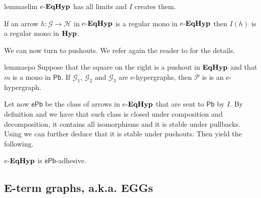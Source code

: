 \documentclass[a4paper,UKenglish,cleveref,pdftex,thm-restate,numberwithinsect]{lipics-v2021}
\newcommand{\pbc}{\mathsf{Pb}}
\newcommand{\pbe}{\mathsf{ePb}}
\newcommand{\catname}[1]{\textbf{\textup{#1}}}
\newcommand{\hyp}{\catname{Hyp}}
\newcommand{\EqHyp}{\catname{EqHyp}} %
\newcommand{\egg}{\mathsf{e}\text{-}\catname{EqHyp}}
\newcommand{\commentato}[1]{ {} }
\begin{document}
\begin{restatable}{lemma}{elim}\label{lem:elim}
	$\egg$ has all limits and $I$ creates them.
\end{restatable}


\begin{corollary}\label{cor:ereg}
	If an arrow $h: \mathcal{G \to H}$ in $\egg$ is a regular mono in $\egg$ then $I(h)$ is a regular mono in $\hyp$. 
\end{corollary}

We can now turn to pushouts. We refer again the reader to  for the details.

\noindent
\parbox{11.5cm}{\begin{restatable}{lemma}{epo}\label{lem:epo}
	Suppose that the square on the right is a pushout in $\EqHyp$ and that $m$ is a mono in $\pbc$. If $\mathcal{G}_1$, $\mathcal{G}_2$ and $\mathcal{G}_3$ are e-hypergraphs, then $\mathcal{P}$ is 
	is an e-hypergraph.
\end{restatable}}\hfill 
\parbox{4cm}{}

\commentato{ 
\begin{restatable}{corollary}{rege}\label{cor:rege}
		An arrow $h\colon \mathcal{G \to H}$  is a regular mono in $\egg$ if and only if $I(h)$ is a regular mono in $\hyp$.  In particular a morphism of $\egg$ is a regular mono if and only if all its components are injections.
\end{restatable}
\begin{proof}
	contenuto...
\end{proof}
}

Let now $\pbe$ be the class of arrows in $\egg$ that are sent to $\pbc$ by $I$. By definition and  we have that such class is closed under composition and decomposition, it contains all isomorphisms and it is stable under pullbacks. Using  we can further deduce that it is stable under pushouts. Then  yield the following.

\begin{corollary}\label{cor:pbe}
	$\egg$ is $\pbe$-adhesive.
\end{corollary}

\subsection{E-term graphs, a.k.a. EGGs}
\end{document}
